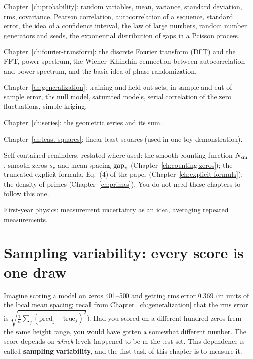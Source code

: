 \begin{prerequisites}
\item Chapter~\ref{ch:probability}: random variables, mean, variance, standard deviation, rms, covariance, Pearson correlation, autocorrelation of a sequence, standard error, the idea of a confidence interval, the law of large numbers, random number generators and seeds, the exponential distribution of gaps in a Poisson process.
\item Chapter~\ref{ch:fourier-transform}: the discrete Fourier transform (DFT) and the FFT, power spectrum, the Wiener--Khinchin connection between autocorrelation and power spectrum, and the basic idea of phase randomization.
\item Chapter~\ref{ch:generalization}: training and held-out sets, in-sample and out-of-sample error, the null model, saturated models, serial correlation of the zero fluctuations, simple kriging.
\item Chapter~\ref{ch:series}: the geometric series and its sum.
\item Chapter~\ref{ch:least-squares}: linear least squares (used in one toy demonstration).
\item Self-contained reminders, restated where used: the smooth counting function $N_{\mathrm{sm}}$, smooth zeros $s_n$ and mean spacing $\mathrm{gap}_n$ (Chapter~\ref{ch:counting-zeros}); the truncated explicit formula, Eq.~(4) of the paper (Chapter~\ref{ch:explicit-formula}); the density of primes (Chapter~\ref{ch:primes}). You do not need those chapters to follow this one.
\item First-year physics: measurement uncertainty as an idea, averaging repeated measurements.
\end{prerequisites}

\section{Sampling variability: every score is one draw}\label{sec:controls-variability}

Imagine scoring a model on zeros 401--500 and getting rms error $0.369$ (in units of the local mean spacing; recall from Chapter~\ref{ch:generalization} that the rms error is $\sqrt{\frac1n\sum_j(\text{pred}_j-\text{true}_j)^2}$). Had you scored on a different hundred zeros from the same height range, you would have gotten a somewhat different number. The score depends on \emph{which} levels happened to be in the test set. This dependence is called \textbf{sampling variability}, and the first task of this chapter is to measure it.

